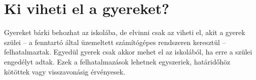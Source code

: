 \section{Ki viheti el a gyereket?}

Gyereket bárki behozhat az iskolába, de elvinni csak az viheti el, akit a gyerek szülei -- a fenntartó által üzemeltett számítógépes rendszeren keresztül -- felhatalmaztak. Egyedül gyerek csak akkor mehet el az iskolából, ha erre a szülei engedélyt adtak. Ezek a felhatalmazások lehetnek egyszeriek, határidőhöz kötöttek vagy visszavonásig érvényesek.

